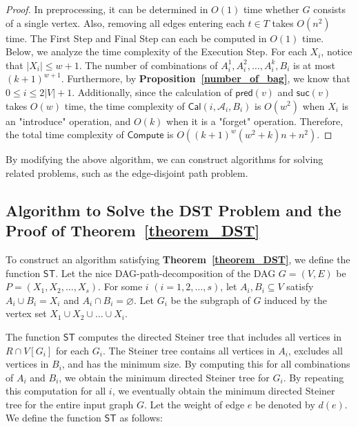 \documentclass[runningheads]{llncs}
\theoremstyle{plain}
\theoremstyle{definition}
\begin{document}
\begin{proof}
    In preprocessing, it can be determined in $O(1)$ time whether $G$ consists of a single vertex. Also, removing all edges entering each $t \in T$ takes $O(n^2)$ time. The First Step and Final Step can each be computed in $O(1)$ time. Below, we analyze the time complexity of the Execution Step. For each $X_i$, notice that $|X_i| \leq w+1$. The number of combinations of $A^1_i, A^2_i, \dots, A^k_i, B_i$ is at most $(k+1)^{w+1}$. Furthermore, by \textbf{Proposition~\ref{number_of_bag}}, we know that $0 \leq i \leq 2|V|+1$. Additionally, since the calculation of $\mathsf{pred}(v)$ and $\mathsf{suc}(v)$ takes $O(w)$ time, the time complexity of $\mathsf{Cal}(i, \mathscr{A}_i, B_i)$ is $O(w^2)$ when $X_i$ is an "introduce" operation, and $O(k)$ when it is a "forget" operation. Therefore, the total time complexity of $\mathsf{Compute}$ is $O((k+1)^w(w^2+k)n+n^2)$.
\end{proof}

By modifying the above algorithm, we can construct algorithms for solving related problems, such as the edge-disjoint path problem.






\subsection{Algorithm to Solve the DST Problem and the Proof of \textbf{Theorem~\ref{theorem_DST}}}\label{appendix_B7}

To construct an algorithm satisfying \textbf{Theorem~\ref{theorem_DST}}, we define the function $\mathsf{ST}$. Let the nice DAG-path-decomposition of the DAG $G = (V, E)$ be $P = (X_1, X_2, \dots, X_s)$. For some $i$ $(i = 1, 2, \dots, s)$, let $A_i, B_i \subseteq V$ satisfy $A_i \cup B_i = X_i$ and $A_i \cap B_i = \varnothing$. Let $G_i$ be the subgraph of $G$ induced by the vertex set $X_1 \cup X_2 \cup \dots \cup X_i$.

The function $\mathsf{ST}$ computes the directed Steiner tree that includes all vertices in $R \cap V[G_i]$ for each $G_i$. The Steiner tree contains all vertices in $A_i$, excludes all vertices in $B_i$, and has the minimum size. By computing this for all combinations of $A_i$ and $B_i$, we obtain the minimum directed Steiner tree for $G_i$. By repeating this computation for all $i$, we eventually obtain the minimum directed Steiner tree for the entire input graph $G$. Let the weight of edge $e$ be denoted by $d(e)$. We define the function $\mathsf{ST}$ as follows:
\end{document}
